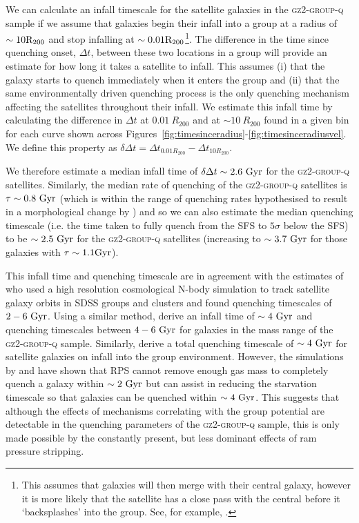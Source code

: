 \documentclass[useAMS,usenatbib]{mn2e}
\begin{document}
We can calculate an infall timescale for the satellite galaxies in the \textsc{gz2-group-q} sample if we assume that galaxies begin their infall into a group at a radius of $\sim10\rm{R}_{200}$ and stop infalling at $\sim0.01\rm{R}_{200}$\footnote{This assumes that galaxies will then merge with their central galaxy, however it is more likely that the satellite has a close pass with the central before it `backsplashes' into the group. See, for example, \cite{pimbblet11}.}. The difference in the time since quenching onset, $\Delta t$, between these two locations in a group will provide an estimate for how long it takes a satellite to infall. This assumes (i) that the galaxy starts to quench immediately when it enters the group and (ii) that the same environmentally driven quenching process is the only quenching mechanism affecting the satellites throughout their infall. We estimate this infall time by calculating the difference in $\Delta t$ at $0.01~R_{200}$ and at $\sim10~R_{200}$ found in a given bin for each curve shown across Figures~\ref{fig:timesinceradius}-\ref{fig:timesinceradiusvel}. We define this property as $\delta \Delta t = \Delta t_{0.01R_{200}} - \Delta t_{10R_{200}}$. 

We therefore estimate a median infall time of $\delta \Delta t \sim 2.6 ~\rm{Gyr}$ for the \textsc{gz2-group-q} satellites. Similarly, the median rate of quenching of the \textsc{gz2-group-q} satellites is $\tau \sim 0.8~\rm{Gyr}$ (which is within the range of quenching rates hypothesised to result in a morphological change by \citealt{smethurst15}) and so we can also estimate the median quenching timescale (i.e. the time taken to fully quench from the SFS to $5\sigma$ below the SFS) to be $\sim 2.5~\rm{Gyr}$ for the \textsc{gz2-group-q} satellites (increasing to $\sim 3.7~\rm{Gyr}$ for those galaxies with $\tau\sim1.1\rm{Gyr}$).

This infall time and quenching timescale are in agreement with the estimates of \cite{wetzel13} who used a high resolution cosmological N-body simulation to track satellite galaxy orbits in SDSS groups and clusters and found quenching timescales of $2-6~\rm{Gyr}$. Using a similar method, \cite{oman16} derive an infall time of $\sim4~\rm{Gyr}$ and quenching timescales between $4-6~\rm{Gyr}$ for galaxies in the mass range of the \textsc{gz2-group-q} sample. Similarly, \cite{hahn16} derive a total quenching timescale of $\sim4~\rm{Gyr}$ for satellite galaxies on infall into the group environment. However, the simulations by \cite{fillingham16} and \cite{emerick16} have shown that RPS cannot remove enough gas mass to completely quench a galaxy within $\sim2~\rm{Gyr}$ but can assist in reducing the starvation timescale so that galaxies can be quenched within $\sim4~\rm{Gyr}$. This suggests that although the effects of mechanisms correlating with the group potential are detectable in the quenching parameters of the \textsc{gz2-group-q} sample, this is only made possible by the constantly present, but less dominant effects of ram pressure stripping. 
\end{document}
